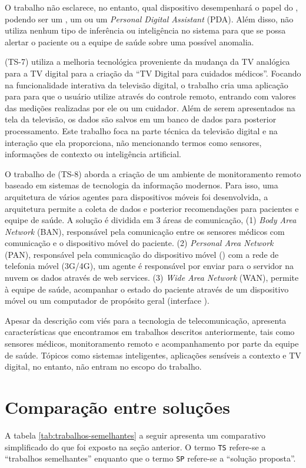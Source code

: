 O trabalho não esclarece, no entanto, qual dispositivo desempenhará o papel do
\gateway[], podendo ser um \tablet[], um \smartphone[] ou um \textit{Personal
Digital Assistant} (PDA). Além disso, não utiliza nenhum tipo de inferência ou
inteligência no sistema para que se possa alertar o paciente ou a equipe de
saúde sobre uma possível anomalia.

 (TS-7) utiliza a melhoria tecnológica proveniente da
mudança da TV analógica para a TV digital para a criação da ``TV Digital para
cuidados médicos''. Focando na funcionalidade interativa da televisão digital,
o trabalho cria uma aplicação para \stb[] para que o usuário utilize através
do controle remoto, entrando com valores das medições realizadas por ele ou um
cuidador. Além de serem apresentados na tela da televisão, os dados são salvos
em um banco de dados para posterior processamento. Este trabalho foca na parte
técnica da televisão digital e na interação que ela proporciona, não
mencionando termos como sensores, informações de contexto ou inteligência
artificial.

O trabalho de  (TS-8) aborda a criação de um ambiente de
monitoramento remoto baseado em sistemas de tecnologia da informação modernos.
Para isso, uma arquitetura de vários agentes para dispositivos móveis foi
desenvolvida, a arquitetura permite a coleta de dados e posterior recomendações
para pacientes e equipe de saúde. A solução é dividida em 3 áreas de
comunicação, (1) \textit{Body Area Network} (BAN), responsável pela comunicação
entre os sensores médicos com comunicação \bluetooth[] e o dispositivo móvel do
paciente.  (2) \textit{Personal Area Network} (PAN), responsável pela
comunicação do dispositivo móvel (\smartphone) com a rede de telefonia móvel
(3G/4G), um agente é responsável por enviar para o servidor na nuvem os dados
através de web services. (3) \textit{Wide Area Network} (WAN), permite à equipe
de saúde, acompanhar o estado do paciente através de um dispositivo móvel ou um
computador de propósito geral (interface \web).

Apesar da descrição com viés para a tecnologia de telecomunicação,
 apresenta características que encontramos em
trabalhos descritos anteriormente, tais como sensores médicos, monitoramento
remoto e acompanhamento por parte da equipe de saúde. Tópicos como sistemas
inteligentes, aplicações sensíveis a contexto e TV digital, no entanto, não
entram no escopo do trabalho.

\section{Comparação entre soluções} \label{sec:comparacao}

A tabela \ref{tab:trabalhos-semelhantes} a seguir apresenta um comparativo
simplificado do que foi exposto na seção anterior. O termo \texttt{TS} refere-se
a ``trabalhos semelhantes'' enquanto que o termo \texttt{SP} refere-se a
``solução proposta''.


